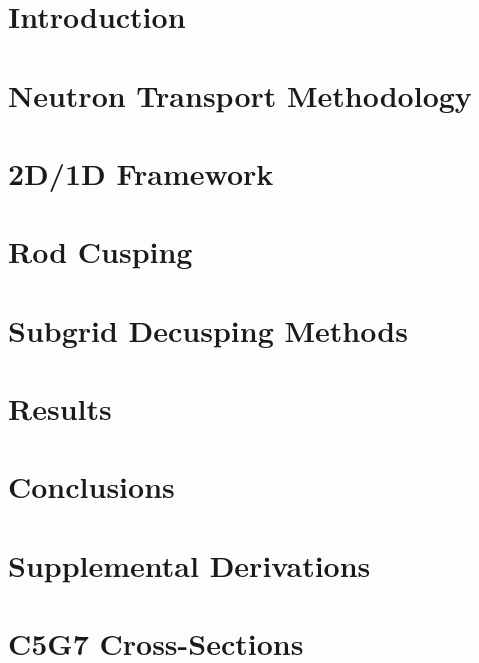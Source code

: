 \documentclass[12pt]{thesis-umich}
\begin{document}

\chapter{Introduction}\label{chap:intro}


\chapter{Neutron Transport Methodology}\label{chap:transport}


\chapter{2D/1D Framework}\label{chap:2d1d}


\chapter{Rod Cusping}\label{chap:cusping}


\chapter{Subgrid Decusping Methods}\label{chap:results}


\chapter{Results}\label{chap:proposed}

 
\chapter{Conclusions}\label{chap:concl}


\appendix
\chapter{Supplemental Derivations}\label{app:derivations}


\chapter{C5G7 Cross-Sections}\label{app:c5g7xs}




\end{document}
